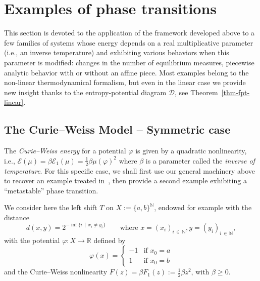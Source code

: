 \documentclass[10pt]{amsart}
\theoremstyle{definition}\newtheorem{defi}[theo]{Definition}\newtheorem{rema}[theo]{Remark}\newtheorem{exam}[theo]{Example}\newtheorem{exem}[theo]{Example}\newtheorem{nota}[theo]{Notation}
\theoremstyle{plain}
\theoremstyle{plain}
\newcommand{\pot}{\varphi}
\newcommand*\8{\infty}
\newcommand\NN{\mathbb{N}}
\newcommand\RR{\mathbb{R}}
\newcommand*\N{\mathbb{N}}
\newcommand{\En}{\mathcal{E}}
\newcommand{\cD}{\mathcal{D}}
\begin{document}
\section{Examples of phase transitions}\label{sec-examples}

This section is devoted to the application of the framework developed above to a few families of systems whose energy depends on a real multiplicative parameter (i.e., an inverse temperature) and exhibiting various behaviors when this parameter is modified: changes in the number of equilibrium measures, piecewise analytic behavior with or without an affine piece. Most examples belong to the non-linear thermodynamical formalism, but even in the linear case we provide new insight thanks to the entropy-potential diagram $\cD$, see Theorem~\ref{thm-fpt-linear}.



\subsection{The Curie--Weiss Model -- Symmetric case}\label{sec-Curie-Weiss}

The \emph{Curie--Weiss energy} for a potential $\pot$ is given by a quadratic nonlinearity, i.e., $\En(\mu) = \beta\En_1(\mu) = \frac{1}{2} \beta \mu(\pot)^2$ where $\beta$ is a parameter called the \emph{inverse of temperature}. For this specific case, we shall first use our general machinery above to recover an example treated in~\cite{Leplaideur-Watbled}, then provide a second example exhibiting a ``metastable'' phase transition.

We consider here the left shift $T$ on $X:=\{a,b\}^\N$, endowed for example with the distance
\[
d(x,y)=2^{-\inf\{i\,\mid\,x_i\neq y_i\}} \qquad \text{where } x=(x_i)_{i\,\in\,\NN}, y=(y_i)_{i\,\in\,\NN},
\]
with the potential $\pot:X\to\RR$ defined by
\[
\pot(x)=
\begin{cases}
-1 &\text{if }x_0 = a \\
1 &\text{if }x_0 = b
\end{cases}
\]
and the Curie--Weiss nonlinearity $F(z) = \beta F_1(z):=\frac{1}{2}\beta z^{2}$, with $\beta\ge 0$.
\end{document}

